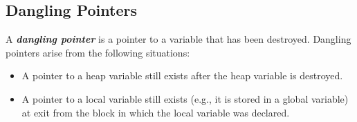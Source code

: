 \subsection{Dangling Pointers}
\label{sec:dangling-pointers}

A \textit{\textbf{dangling pointer}} is a pointer to a variable that has been destroyed. Dangling pointers arise from the following situations:
\begin{itemize}
  \item A pointer to a heap variable still exists after the heap variable is destroyed.
  \item A pointer to a local variable still exists (e.g., it is stored in a global variable) at exit from the block in which the local variable was declared.
\end{itemize}
